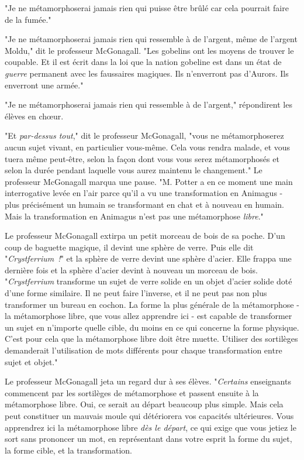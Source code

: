 "Je ne métamorphoserai jamais rien qui puisse être brûlé car cela pourrait faire de la fumée."

"Je ne métamorphoserai jamais rien qui ressemble à de l'argent, même de l'argent Moldu," dit le professeur McGonagall. "Les gobelins ont les moyens de trouver le coupable. Et il est écrit dans la loi que la nation gobeline est dans un état de \emph{guerre} permanent avec les faussaires magiques. Ils n'enverront pas d'Aurors. Ils enverront une armée."

"Je ne métamorphoserai jamais rien qui ressemble à de l'argent," répondirent les élèves en chœur.

"Et \emph{par-dessus tout}," dit le professeur McGonagall, "vous ne métamorphoserez aucun sujet vivant, en particulier vous-même. Cela vous rendra malade, et vous tuera même peut-être, selon la façon dont vous vous serez métamorphosés et selon la durée pendant laquelle vous aurez maintenu le changement." Le professeur McGonagall marqua une pause. "M. Potter a en ce moment une main interrogative levée en l'air parce qu'il a vu une transformation en Animagus - plus précisément un humain se transformant en chat et à nouveau en humain. Mais la transformation en Animagus n'est pas une métamorphose \emph{libre}."

Le professeur McGonagall extirpa un petit morceau de bois de sa poche. D'un coup de baguette magique, il devint une sphère de verre. Puis elle dit "\emph{Crystferrium~!}" et la sphère de verre devint une sphère d'acier. Elle frappa une dernière fois et la sphère d'acier devint à nouveau un morceau de bois. "\emph{Crystferrium} transforme un sujet de verre solide en un objet d'acier solide doté d'une forme similaire. Il ne peut faire l'inverse, et il ne peut pas non plus transformer un bureau en cochon. La forme la plus générale de la métamorphose - la métamorphose libre, que vous allez apprendre ici - est capable de transformer un sujet en n'importe quelle cible, du moins en ce qui concerne la forme physique. C'est pour cela que la métamorphose libre doit être muette. Utiliser des sortilèges demanderait l'utilisation de mots différents pour chaque transformation entre sujet et objet."

Le professeur McGonagall jeta un regard dur à ses élèves. "\emph{Certains} enseignants commencent par les sortilèges de métamorphose et passent ensuite à la métamorphose libre. Oui, ce serait au départ beaucoup plus simple. Mais cela peut constituer un mauvais moule qui détériorera vos capacités ultérieures. Vous apprendrez ici la métamorphose libre \emph{dès le départ}, ce qui exige que vous jetiez le sort sans prononcer un mot, en représentant dans votre esprit la forme du sujet, la forme cible, et la transformation.


